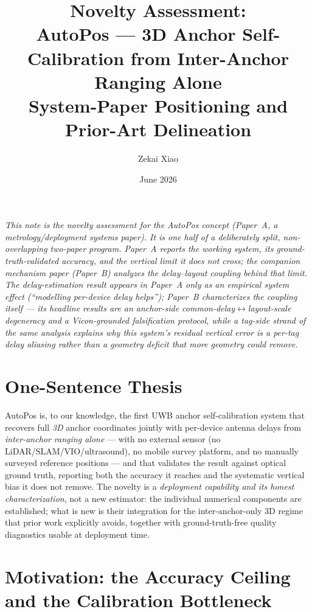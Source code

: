 \documentclass[11pt,a4paper]{article}
\title{Novelty Assessment:\\
       AutoPos --- 3D Anchor Self-Calibration from Inter-Anchor Ranging Alone\\[5pt]
       \large System-Paper Positioning and Prior-Art Delineation}
\author{Zekai Xiao}
\date{June 2026}
\begin{document}
\maketitle

\textit{This note is the novelty assessment for the AutoPos concept (Paper~A, a
metrology/deployment systems paper). It is one half of a deliberately split, non-overlapping two-paper program. Paper~A
reports the working system, its ground-truth-validated accuracy, and the vertical limit it does
not cross; the companion mechanism paper (Paper~B) analyzes the delay--layout coupling behind that
limit. The delay-estimation result appears in Paper~A only as an empirical system effect
(``modelling per-device delay helps''); Paper~B characterizes the coupling itself --- its
\emph{headline} results are an anchor-side common-delay$\leftrightarrow$layout-scale degeneracy and a Vicon-grounded falsification protocol, while a
\emph{tag-side} strand of the same analysis explains why \emph{this} system's residual vertical error
is a per-tag delay aliasing rather than a geometry deficit that more geometry could remove.}

\section{One-Sentence Thesis}

AutoPos is, to our knowledge, the first UWB anchor self-calibration system that recovers full
\emph{3D} anchor coordinates jointly with per-device antenna delays from \emph{inter-anchor ranging
alone} --- with no external sensor (no LiDAR/SLAM/VIO/ultrasound), no mobile survey platform, and no
manually surveyed reference positions --- and that validates the result against optical ground
truth, reporting both the accuracy it reaches and the systematic vertical bias it does not remove.
The novelty is a \emph{deployment capability and its honest characterization}, not a new estimator:
the individual numerical components are established; what is new is their integration for the
inter-anchor-only 3D regime that prior work explicitly avoids, together with ground-truth-free
quality diagnostics usable at deployment time.

\section{Motivation: the Accuracy Ceiling and the Calibration Bottleneck}
\end{document}

